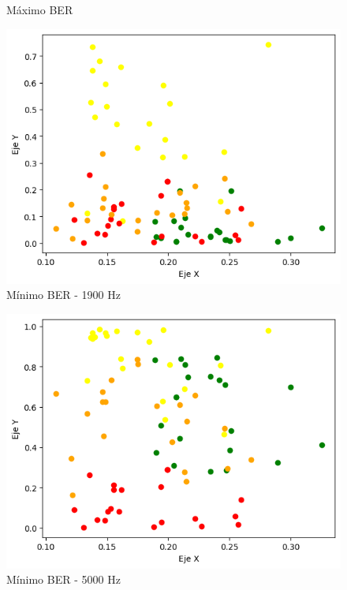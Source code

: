 \documentclass[a4paper, 12pt]{article}
\begin{document}
\begin{itemize}
\begin{itemize}
\begin{figure}[htbp]
\begin{minipage}[t]{0.5\textwidth}
                    \caption{Máximo BER}
                    \label{BER 1}
                \end{minipage}%
                \begin{minipage}[t]{0.5\textwidth}
                    \centering
                    \includegraphics[width=0.8\linewidth]{BER2.png}
                    \caption{Mínimo BER - 1900 Hz}
                    \label{BER 2}
                \end{minipage}
            \end{figure}
            \begin{figure}[htbp]
                \begin{minipage}[t]{0.5\textwidth}
                    \centering
                    \includegraphics[width=0.8\linewidth]{BER3.png}
                    \caption{Mínimo BER - 5000 Hz}
                    \label{BER 3}
                \end{minipage}%
                \begin{minipage}[t]{0.5\textwidth}

\end{minipage}
\end{figure}
\end{itemize}
\end{itemize}
\end{document}
